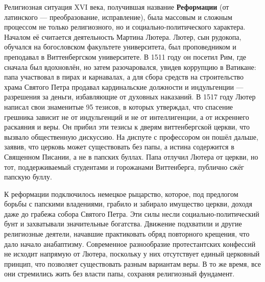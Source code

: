 
Религиозная ситуация XVI века, получившая название \textbf{Реформации} (от латинского --- преобразование, исправление), была массовым и сложным процессом не только религиозного, но и социально-политического характера. Началом её считается деятельность Мартина Лютера. Лютер, сын рудокопа, обучался на богословском факультете университета, был проповедником и преподавал в Виттенбергском университете. В 1511 году он посетил Рим, где сначала был вдохновлён, но затем разочаровался, увидев коррупцию в Ватикане: папа участвовал в пирах и карнавалах, а для сбора средств на строительство храма Святого Петра продавал кардинальские должности и индульгенции --- разрешения за деньги, избавляющие от духовных наказаний.
В 1517 году Лютер написал свои знаменитые 95 тезисов, в которых утверждал, что спасение грешника зависит не от индульгенций и не от интеллигенции, а от искреннего раскаяния и веры. Он прибил эти тезисы к дверям виттенбергской церкви, что вызвало общественную дискуссию. На диспуте с профессором он пошёл дальше, заявив, что церковь может существовать без папы, а истина содержится в Священном Писании, а не в папских буллах. Папа отлучил Лютера от церкви, но тот, поддерживаемый студентами и горожанами Виттенберга, публично сжёг папскую буллу.

К реформации подключилось немецкое рыцарство, которое, под предлогом борьбы с папскими владениями, грабило и забирало имущество церкви, доходя даже до грабежа собора Святого Петра. Эти силы несли социально-политический бунт и захватывали значительные богатства.
Движение подхватили и другие религиозные деятели, начавшие практиковать обряд повторного крещения, что дало начало анабаптизму. Современное разнообразие протестантских конфессий не исходит напрямую от Лютера, поскольку у них отсутствует единый церковный принцип, что позволяет существовать разным вариантам веры. В то же время, все они стремились жить без власти папы, сохраняя религиозный фундамент.


